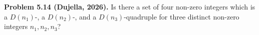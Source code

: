 \textbf{Problem 5.14 (Dujella, 2026).} Is there a set of four non-zero integers which is a $D(n_1)$-, a $D(n_2)$-, and a $D(n_3)$-quadruple for three distinct non-zero integers $n_1,n_2,n_3$?
